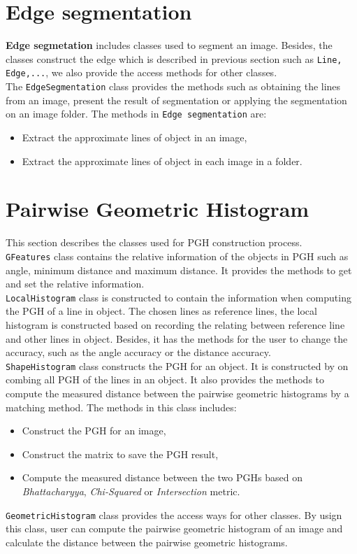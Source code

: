 \section{Edge segmentation }
\textbf{Edge segmetation} includes classes used to segment an image. Besides, the classes construct the edge which is described in previous section such as \texttt{Line, Edge,...}, we also provide the access methods for other classes.\\[0.2cm]
The \texttt{EdgeSegmentation} class provides the methods such as obtaining the lines from an image, present the result of segmentation or applying the segmentation on an image folder. The methods in \texttt{Edge segmentation} are:
\begin{itemize}
\item Extract the approximate lines of object in an image,
\item Extract the approximate lines of object in each image in a folder.
\end{itemize}
\section{Pairwise Geometric Histogram}
This section describes the classes used for PGH construction process.\\[0.2cm]
\texttt{GFeatures} class contains the relative information of the objects in PGH such as angle, minimum distance and maximum distance. It provides the methods to get and set the relative information.\\[0.2cm]
\texttt{LocalHistogram} class is constructed to contain the information when computing the PGH of a line in object. The chosen lines as reference lines, the local histogram is constructed based on recording the relating between reference line and other lines in object. Besides, it has the methods for the user to change the accuracy, such as the angle accuracy or the distance accuracy.\\[0.2cm]
\texttt{ShapeHistogram} class constructs the PGH for an object. It is constructed by on combing all PGH of the lines in an object. It also provides the methods to compute the measured distance between the pairwise geometric histograms by a matching method. The methods in this class includes:
\begin{itemize}
\item Construct the PGH for an image,
\item Construct the matrix to save the PGH result,
\item Compute the measured distance between the two PGHs based on \textit{Bhattacharyya}, \textit{Chi-Squared} or \textit{Intersection} metric.
\end{itemize}
\texttt{GeometricHistogram} class provides the access ways for other classes. By usign this class, user can compute the pairwise geometric histogram of an image and calculate the distance between the pairwise geometric histograms.
